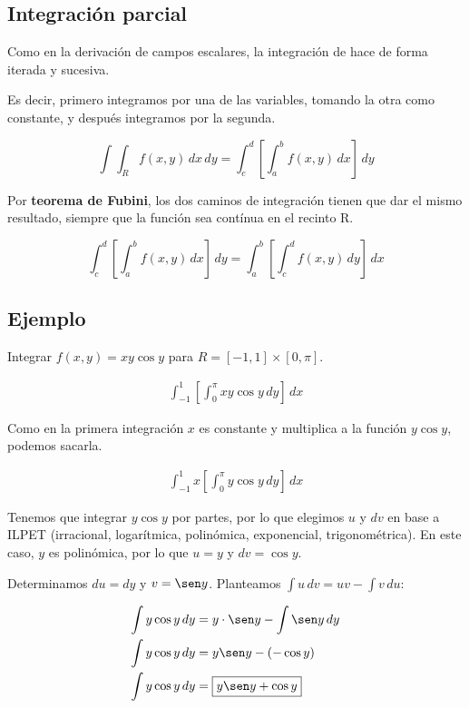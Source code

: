 \subsection{Integración parcial}

Como en la derivación de campos escalares,
la integración de hace de forma iterada y sucesiva.

Es decir, primero integramos por una de las variables, tomando la otra como constante, y después integramos por la segunda.

\begin{equation*}
    \int\int_R f(x,y) \,dx\,dy = \int_{c}^{d} [\int_{a}^{b} f(x,y) \,dx] \,dy
\end{equation*}

Por \textbf{teorema de Fubini},
los dos caminos de integración tienen que dar el mismo resultado,
siempre que la función sea contínua en el recinto R.

\begin{equation*}
    \int_{c}^{d} [\int_{a}^{b} f(x,y) \,dx] \,dy = \int_{a}^{b} [\int_{c}^{d} f(x,y) \,dy] \,dx
\end{equation*}

\subsection{Ejemplo}

Integrar \(f(x,y) = xy\cos y\) para \(R = [-1,1] \times [0,\pi] \).

\begin{align*}
    \int_{-1}^{1} [\int_{0}^{\pi} xy\cos y \,dy] \,dx
\end{align*}

Como en la primera integración \(x\) es constante y multiplica a la función \(y\cos y\), podemos sacarla.

\begin{align*}
    \int_{-1}^{1} x [\int_{0}^{\pi} y\cos y \,dy] \,dx
\end{align*}

Tenemos que integrar \(y\cos y\) por partes, por lo que elegimos \(u\) y \(dv\) en base a ILPET (irracional, logarítmica, polinómica, exponencial, trigonométrica).
En este caso, \(y\) es polinómica, por lo que \(u = y\) y \(dv = \cos y\).

Determinamos \(du = dy\) y \(v = \sen y\). Planteamos \(\int u\,dv = uv - \int v \,du\):

\begin{align*}
    \int y\cos y \,dy & = y \cdot \sen y - \int \sen y \,dy \\
    \int y\cos y \,dy & = y \sen y - (-\cos y) \\
    \int y\cos y \,dy & = \boxed{y \sen y + \cos y}
\end{align*}

